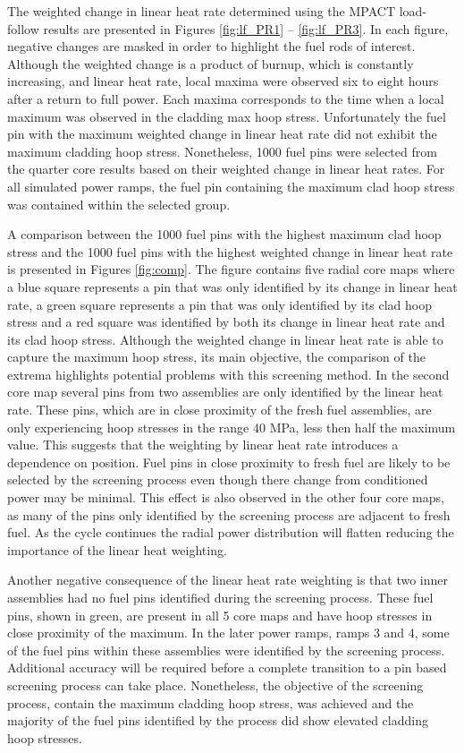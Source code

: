 \documentclass[edeposit,fullpage,11pt]{uiucthesis2009}
\begin{document}
The weighted change in linear heat rate determined using the MPACT load-follow results are presented in Figures \ref{fig:lf_PR1} -- \ref{fig:lf_PR3}.
In each figure, negative changes are masked in order to highlight the fuel rods of interest.
Although the weighted change is a product of burnup, which is constantly increasing, and linear heat rate, local maxima were observed six to eight hours after a return to full power.
Each maxima corresponds to the time when a local maximum was observed in the cladding max hoop stress.
Unfortunately the fuel pin with the maximum weighted change in linear heat rate did not exhibit the maximum cladding hoop stress. 
Nonetheless, 1000 fuel pins were selected from the quarter core results based on their weighted change in linear heat rates.
For all simulated power ramps, the fuel pin containing the maximum clad hoop stress was contained within the selected group.
 
A comparison between the 1000 fuel pins with the highest maximum clad hoop stress and the 1000 fuel pins with the highest weighted change in linear heat rate is presented in Figures \ref{fig:comp}.
The figure contains five radial core maps where a blue square represents a pin that was only identified by its change in linear heat rate, a green square represents a pin that was only identified by its clad hoop stress and a red square was identified by both its change in linear heat rate and its clad hoop stress.
Although the weighted change in linear heat rate is able to capture the maximum hoop stress, its main objective, the comparison of the extrema highlights potential problems with this screening method.
In the second core map several pins from two assemblies are only identified by the linear heat rate.
These pins, which are in close proximity of the fresh fuel assemblies, are only experiencing hoop stresses in the range 40 MPa, less then half the maximum value.
This suggests that the weighting by linear heat rate introduces a dependence on position.
Fuel pins in close proximity to fresh fuel are likely to be selected by the screening process even though there change from conditioned power may be minimal.
This effect is also observed in the other four core maps, as many of the pins only identified by the screening process are adjacent to fresh fuel.
As the cycle continues the radial power distribution will flatten reducing the importance of the linear heat weighting.

Another negative consequence of the linear heat rate weighting is that two inner assemblies had no fuel pins identified during the screening process.
These fuel pins, shown in green, are present in all 5 core maps and have hoop stresses in close proximity of the maximum.
In the later power ramps, ramps 3 and 4, some of the fuel pins within these assemblies were identified by the screening process.
Additional accuracy will be required before a complete transition to a pin based screening process can take place.
Nonetheless, the objective of the screening process, contain the maximum cladding hoop stress, was achieved and the majority of the fuel pins identified by the process did show elevated cladding hoop stresses.
\end{document}
